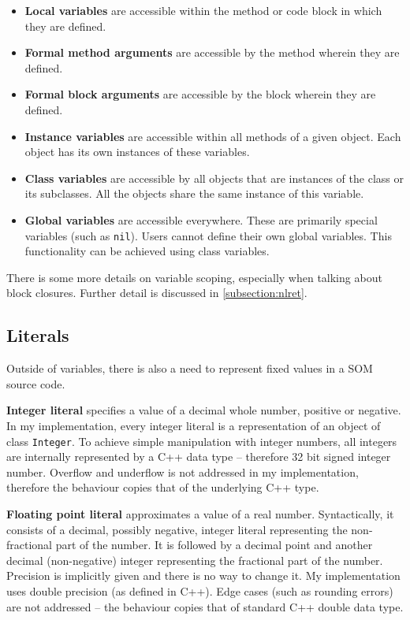 \documentclass[thesis=M,english]{FITthesis}[2019/12/23]
\begin{document}
\begin{itemize}
	\item \textbf{Local variables} are accessible within the method or code block in which they are defined.
	\item \textbf{Formal method arguments} are accessible by the method wherein they are defined.
	\item \textbf{Formal block arguments} are accessible by the block wherein they are defined.
	\item \textbf{Instance variables} are accessible within all methods of a given object. Each object
		has its own instances of these variables.
	\item \textbf{Class variables} are accessible by all objects that are instances of the class or its
		subclasses. All the objects share the same instance of this variable.
	\item \textbf{Global variables} are accessible everywhere. These are primarily special variables
		(such as \texttt{nil}). Users cannot define their own global variables. This functionality can be
		achieved using class variables.
\end{itemize}

There is some more details on variable scoping, especially when talking about block closures. Further detail
is discussed in \ref{subsection:nlret}.

\subsection{Literals}
Outside of variables, there is also a need to represent fixed values in a SOM source code. 

\textbf{Integer literal} specifies a value of a decimal whole number, positive or negative.
In my implementation, every integer literal is a representation of an object of class \texttt{Integer}. 
To achieve simple manipulation with integer numbers, all integers are internally represented by a C++
data type \texttt{} -- therefore 32 bit signed integer number. Overflow and underflow is not
addressed in my implementation, therefore the behaviour copies that of the underlying C++ type.

\textbf{Floating point literal} approximates a value of a real number. Syntactically, it consists of
a decimal, possibly negative, integer literal representing the non-fractional part of the number. It is
followed by a decimal point and another decimal (non-negative) integer representing the fractional part
of the number. Precision is implicitly given and there is no way to change it. My implementation uses
double precision (as defined in C++). Edge cases (such as rounding errors) are not addressed -- the behaviour
copies that of standard C++ double data type.
\end{document}
